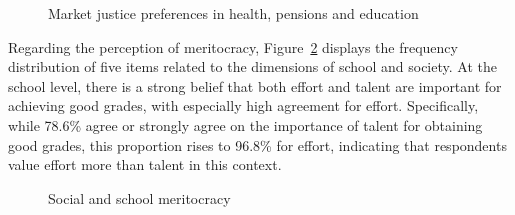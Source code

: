\documentclass[
    behavsci,
    article,
    submit,
moreauthors
]{mdpi}
\begin{document}
\begin{figure}


\caption{\label{fig-marketjustice}Market justice preferences in health,
pensions and education}

\end{figure}%

Regarding the perception of meritocracy, Figure~\ref{fig-meritocracy}
displays the frequency distribution of five items related to the
dimensions of school and society. At the school level, there is a strong
belief that both effort and talent are important for achieving good
grades, with especially high agreement for effort. Specifically, while
78.6\% agree or strongly agree on the importance of talent for obtaining
good grades, this proportion rises to 96.8\% for effort, indicating that
respondents value effort more than talent in this context.

\begin{figure}


\caption{\label{fig-meritocracy}Social and school meritocracy}

\end{figure}%
\end{document}
